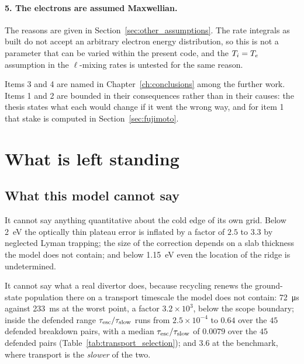\paragraph{5. The electrons are assumed Maxwellian.} The reasons are given in
Section~\ref{sec:other_assumptions}. The rate integrals as built do not accept
an arbitrary electron energy distribution, so this is not a parameter that can
be varied within the present code, and the $T_i = T_e$ assumption in the
$\ell$-mixing rates is untested for the same reason.

\medskip

\noindent Items 3 and 4 are named in Chapter~\ref{ch:conclusions} among the
further work. Items 1 and 2 are bounded in their consequences rather than in
their causes: the thesis states what each would change if it went the wrong
way, and for item 1 that stake is computed in Section~\ref{sec:fujimoto}.

\section{What is left standing}
\label{sec:limits_summary}

\subsection{What this model cannot say}

It cannot say anything quantitative about the cold edge of its own grid. Below
\SI{2}{\electronvolt} the optically thin plateau error is inflated by a factor
of $2.5$ to $3.3$ by neglected Lyman trapping; the size of the correction
depends on a slab thickness the model does not contain; and below
\SI{1.15}{\electronvolt} even the location of the ridge is undetermined.

It cannot say what a real divertor does, because recycling renews the
ground-state population there on a transport timescale the model does not
contain: \SI{72}{\micro\second} against \SI{233}{\milli\second} at the worst
point, a factor $3.2\times10^{3}$, below the scope boundary; inside the defended
range $\tau_{\mathrm{esc}}/\tau_{\mathrm{slow}}$ runs from $2.5\times10^{-4}$ to $0.64$ over the $45$
defended breakdown pairs, with a median $\tau_{\mathrm{esc}}/\tau_{\mathrm{slow}}$ of
$0.0079$ over the $45$ defended pairs (Table~\ref{tab:transport_selection}); and
$3.6$ at the benchmark, where transport is the \emph{slower} of the two.

